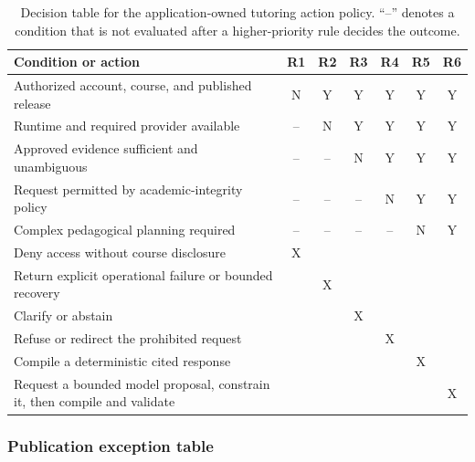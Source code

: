 \begin{table}[htbp]
  \centering
  \scriptsize
  \setlength{\tabcolsep}{3.5pt}
  \begin{tabularx}{\textwidth}{Xcccccc}
    \toprule
    Condition or action & R1 & R2 & R3 & R4 & R5 & R6 \\
    \midrule
    Authorized account, course, and published release & N & Y & Y & Y & Y & Y \\
    Runtime and required provider available & -- & N & Y & Y & Y & Y \\
    Approved evidence sufficient and unambiguous & -- & -- & N & Y & Y & Y \\
    Request permitted by academic-integrity policy & -- & -- & -- & N & Y & Y \\
    Complex pedagogical planning required & -- & -- & -- & -- & N & Y \\
    \midrule
    Deny access without course disclosure & X & & & & & \\
    Return explicit operational failure or bounded recovery & & X & & & & \\
    Clarify or abstain & & & X & & & \\
    Refuse or redirect the prohibited request & & & & X & & \\
    Compile a deterministic cited response & & & & & X & \\
    Request a bounded model proposal, constrain it, then compile and validate & & & & & & X \\
    \bottomrule
  \end{tabularx}
  \caption{Decision table for the application-owned tutoring action policy. ``--'' denotes a condition that is not evaluated after a higher-priority rule decides the outcome.}
  \label{tab:tutoring-action-decision}
\end{table}

\subsubsection{Publication exception table}
\label{sec:publication-exceptions}

